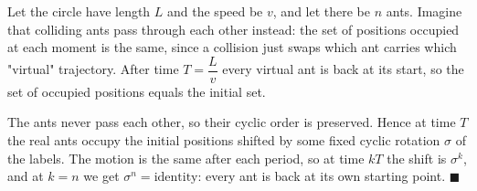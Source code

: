 Let the circle have length $L$ and the speed be $v$, and let there be $n$ ants. Imagine that colliding ants pass through each other instead: the set of positions occupied at each moment is the same, since a collision just swaps which ant carries which "virtual" trajectory. After time $T=\dfrac Lv$ every virtual ant is back at its start, so the set of occupied positions equals the initial set.

The ants never pass each other, so their cyclic order is preserved. Hence at time $T$ the real ants occupy the initial positions shifted by some fixed cyclic rotation $\sigma$ of the labels. The motion is the same after each period, so at time $kT$ the shift is $\sigma^k$, and at $k=n$ we get $\sigma^n=\text{identity}$: every ant is back at its own starting point. $\blacksquare$
